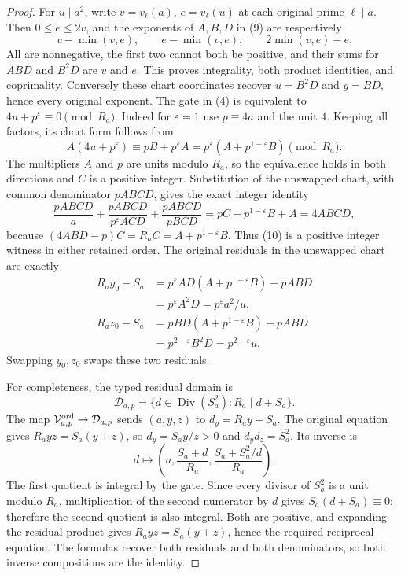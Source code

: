 \begin{theorem}
\begin{proof}
For \(u\mid a^2\), write \(v=v_\ell(a)\), \(e=v_\ell(u)\) at
each original prime \(\ell\mid a\). Then \(0\le e\le2v\), and
the exponents of \(A,B,D\) in (9) are respectively
\[
 v-\min(v,e),\qquad e-\min(v,e),\qquad 2\min(v,e)-e.
\]
All are nonnegative, the first two cannot both be positive, and
their sums for \(ABD\) and \(B^2D\) are \(v\) and \(e\).
This proves integrality, both product identities, and coprimality.
Conversely these chart coordinates recover \(u=B^2D\) and
\(g=BD\), hence every original exponent. The gate in (4) is
equivalent to \(4u+p^\varepsilon\equiv0\pmod{R_a}\). Indeed for
\(\varepsilon=1\) use \(p\equiv4a\) and the unit \(4\).
Keeping all factors, its chart form follows from
\[
 A(4u+p^\varepsilon)
 \equiv pB+p^\varepsilon A
 =p^\varepsilon(A+p^{1-\varepsilon}B)\pmod{R_a}.
\]
The multipliers \(A\) and \(p\) are units modulo \(R_a\), so the
equivalence holds in both directions and \(C\) is a positive
integer. Substitution of the unswapped chart, with common
denominator \(pABCD\), gives the exact integer identity
\[
 \frac{pABCD}{a}+\frac{pABCD}{p^\varepsilon ACD}
 +\frac{pABCD}{pBCD}
 =pC+p^{1-\varepsilon}B+A
 =4ABCD,
\]
because \((4ABD-p)C=R_aC=A+p^{1-\varepsilon}B\).
Thus (10) is a positive integer witness in either retained order.
The original residuals in the unswapped chart are exactly
\[
 \begin{aligned}
 R_a y_0-S_a
  &=p^\varepsilon A D(A+p^{1-\varepsilon}B)-pABD\\
  &=p^\varepsilon A^2D=p^\varepsilon a^2/u,\\
 R_a z_0-S_a
  &=pBD(A+p^{1-\varepsilon}B)-pABD\\
  &=p^{2-\varepsilon}B^2D=p^{2-\varepsilon}u.
 \end{aligned} \tag{10b}
\]
Swapping \(y_0,z_0\) swaps these two residuals.

For completeness, the typed residual domain is
\[
 \mathcal D_{a,p}
 =\{d\in\operatorname{Div}(S_a^2):R_a\mid d+S_a\}.
\]
The map \(\mathcal V_{a,p}^{\rm ord}\to\mathcal D_{a,p}\) sends
\((a,y,z)\) to \(d_y=R_a y-S_a\). The original equation gives
\(R_a yz=S_a(y+z)\), so \(d_y=S_a y/z>0\) and
\(d_y d_z=S_a^2\). Its inverse is
\[
 d\longmapsto
 \left(a,\frac{S_a+d}{R_a},\frac{S_a+S_a^2/d}{R_a}\right).
 \tag{10c}
\]
The first quotient is integral by the gate. Since every divisor
of \(S_a^2\) is a unit modulo \(R_a\), multiplication of the second
numerator by \(d\) gives \(S_a(d+S_a)\equiv0\); therefore the second
quotient is also integral. Both are positive, and expanding the
residual product gives \(R_a yz=S_a(y+z)\), hence the required
reciprocal equation. The formulas recover both residuals and both
denominators, so both inverse compositions are the identity.


\end{proof}
\end{theorem}

